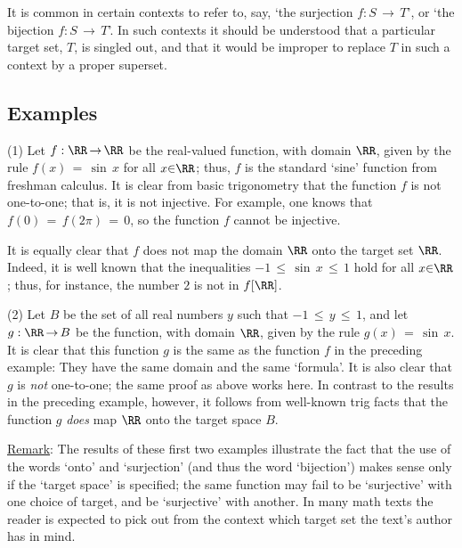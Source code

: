 {        It is common in certain contexts to refer to, say, `the surjection $f:S \,{\rightarrow}\, T$', or `the bijection $f:S \,{\rightarrow}\, T$'.
    In such contexts it should be understood that a particular target set, $T$, is singled out,
    and that it would be improper to replace $T$ in such a context by a proper superset.

\V
\V

        \subsection{\small{{\bf Examples}}}
        \label{ExampA30.50}

\V

\hspace*{\parindent}
        (1) Let $f:{\RR} \,{\rightarrow}\, {\RR}$ be the real-valued function, with domain ${\RR}$,
    given by the rule $f(x) \,=\, {\sin}\,x$ for all $x{\in}{\RR}$; thus, $f$ is the standard `sine' function from freshman calculus.
    It is clear from basic trigonometry that the function $f$ is not one-to-one;
    that is, it is not injective.
    For example, one knows that $f(0) \,=\, f(2{\pi}) \,=\, 0$, so the function $f$ cannot be injective.

        It is equally clear that $f$ does not map the domain ${\RR}$ onto the target set ${\RR}$.
    Indeed, it is well known that the inequalities $-1\,{\leq}\,{\sin}\,x\,{\leq}\,1$ hold for all $x{\in}{\RR}$; thus, for instance, the number $2$ is not in $f[{\RR}]$.

\V

        (2) Let $B$ be the set of all real numbers $y$ such that $-1\,{\leq}\,y\,{\leq}\,1$,
    and let $g:{\RR} \,{\rightarrow}\, B$ be the function, with domain ${\RR}$, given by the rule $g(x) \,=\, {\sin}\,x$.
    It is clear that this function $g$ is the same as the function $f$ in the preceding example: They have the same domain and the same `formula'.
    It is also clear that $g$ is {\em not} one-to-one; the same proof as above works here.
    In contrast to the results in the preceding example, however, it follows from well-known trig facts that the function $g$ {\em does} map ${\RR}$ onto the target space $B$.

\V

\underline{Remark}: The results of these first two examples illustrate the fact that the use of the words `onto' and `surjection' (and thus the word `bijection') makes sense only if the `target space' is specified;
    the same function may fail to be `surjective' with one choice of target, and be `surjective' with another.
    In many math texts the reader is expected to pick out from the context which target set the text's author has in mind.

}

